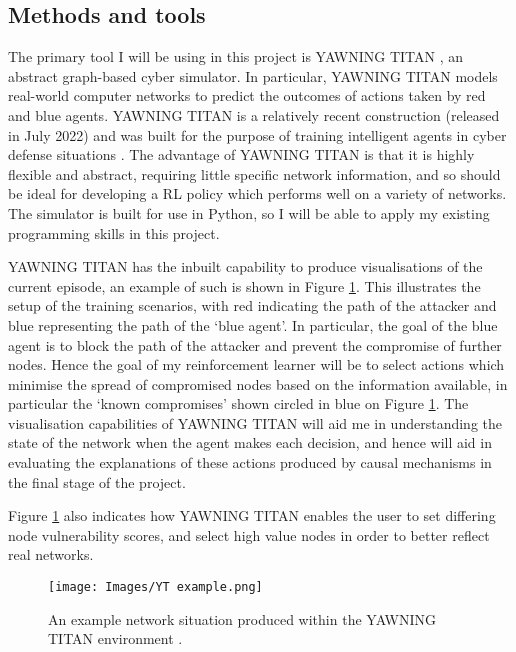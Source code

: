 \documentclass{article}
\begin{document}
\subsection{Methods and tools}
The primary tool I will be using in this project is YAWNING TITAN \cite{andrew2022developing}, an abstract graph-based cyber simulator. 
In particular, YAWNING TITAN models real-world computer networks to predict the outcomes of actions taken by red and blue agents. YAWNING TITAN is a relatively recent construction (released in July 2022) and was built for the purpose of training intelligent agents in cyber defense situations \cite{andrew2022developing}. The advantage of YAWNING TITAN is that it is highly flexible and abstract, requiring little specific network information, and so should be ideal for developing a RL policy which performs well on a variety of networks. The simulator is built for use in Python, so I will be able to apply my existing programming skills in this project. 

YAWNING TITAN has the inbuilt capability to produce visualisations of the current episode, an example of such is shown in Figure \ref{fig:YT}. This illustrates the setup of the training scenarios, with red indicating the path of the attacker and blue representing the path of the `blue agent'. In particular, the goal of the blue agent is to block the path of the attacker and prevent the compromise of further nodes. Hence the goal of my reinforcement learner will be to select actions which minimise the spread of compromised nodes based on the information available, in particular the `known compromises' shown circled in blue on Figure \ref{fig:YT}. The visualisation capabilities of YAWNING TITAN will aid me in understanding the state of the network when the agent makes each decision, and hence will aid in evaluating the explanations of these actions produced by causal mechanisms in the final stage of the project. 

Figure \ref{fig:YT} also indicates how YAWNING TITAN enables the user to set differing node vulnerability scores, and select high value nodes in order to better reflect real networks. 

\begin{figure}[htp]
    \centering
    \texttt{[image: Images/YT example.png]}
    \caption{An example network situation produced within the YAWNING TITAN environment \footnotemark .}
    \label{fig:YT}
\end{figure}

\medskip
\medskip
\medskip
\medskip
\medskip
\medskip
\medskip
\end{document}
